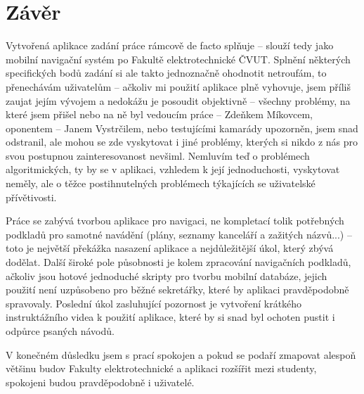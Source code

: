 \chapter{Závěr}
Vytvořená aplikace zadání práce rámcově de facto splňuje -- slouží tedy jako mobilní navigační systém po Fakultě elektrotechnické ČVUT. Splnění některých specifických bodů zadání si ale takto jednoznačně ohodnotit netroufám, to přenechávám uživatelům -- ačkoliv mi použití aplikace plně vyhovuje, jsem příliš zaujat jejím vývojem a nedokážu je posoudit objektivně -- všechny problémy, na které jsem přišel nebo na ně byl vedoucím práce -- Zdeňkem Míkovcem, oponentem -- Janem Vystrčilem, nebo testujícími kamarády upozorněn, jsem snad odstranil, ale mohou se zde vyskytovat i jiné problémy, kterých si nikdo z nás pro svou postupnou zainteresovanost nevšiml. Nemluvím teď o problémech algoritmických, ty by se v aplikaci, vzhledem k její jednoduchosti, vyskytovat neměly, ale o těžce postihnutelných problémech týkajících se uživatelské přívětivosti.

Práce se zabývá tvorbou aplikace pro navigaci, ne kompletací tolik potřebných podkladů pro samotné navádění (plány, seznamy kanceláří a zažitých názvů...) -- toto je největší překážka nasazení aplikace a nejdůležitější úkol, který zbývá dodělat. Další široké pole působnosti je kolem zpracování navigačních podkladů, ačkoliv jsou hotové jednoduché skripty pro tvorbu mobilní databáze, jejich použití není uzpůsobeno pro běžné sekretářky, které by aplikaci pravděpodobně spravovaly. Poslední úkol zasluhující pozornost je vytvoření krátkého instruktážního videa k použití aplikace, které by si snad byl ochoten pustit i odpůrce psaných návodů.

V konečném důsledku jsem s prací spokojen a pokud se podaří zmapovat alespoň většinu budov Fakulty elektrotechnické a aplikaci rozšířit mezi studenty, spokojeni budou pravděpodobně i uživatelé.

